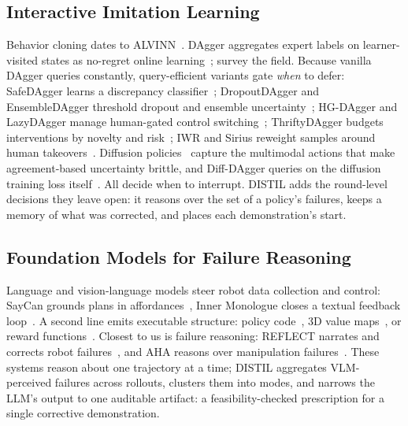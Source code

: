 \documentclass[letterpaper]{article} %
\begin{document}
\subsection{Interactive Imitation Learning}
Behavior cloning dates to ALVINN~\citep{pomerleau1988alvinn}. DAgger
aggregates expert labels on
learner-visited states as no-regret online
learning~\citep{ross2011dagger}; \citet{celemin2022iil} survey the field. Because vanilla DAgger queries
constantly, query-efficient variants gate \emph{when} to defer: SafeDAgger
learns a discrepancy classifier~\citep{zhang2017safedagger}; DropoutDAgger and
EnsembleDAgger threshold dropout and ensemble
uncertainty~\citep{menda2017dropoutdagger,menda2019ensembledagger}; HG-DAgger and LazyDAgger manage human-gated
control switching~\citep{kelly2019hgdagger,hoque2021lazydagger};
ThriftyDAgger budgets interventions by novelty and
risk~\citep{hoque2021thriftydagger}; IWR and Sirius reweight samples
around human takeovers~\citep{mandlekar2020iwr,liu2023sirius}. Diffusion
policies~\citep{chi2023diffusionpolicy,ho2020ddpm} capture
the multimodal actions that make agreement-based uncertainty brittle, and
Diff-DAgger queries on the diffusion training loss
itself~\citep{lee2025diffdagger}. All decide when to interrupt. DISTIL adds
the round-level decisions they leave open: it reasons over the set of a
policy's failures, keeps a memory of what was corrected, and places each
demonstration's start.

\subsection{Foundation Models for Failure Reasoning}
Language and vision-language models steer robot data collection and
control: SayCan grounds plans in affordances~\citep{ahn2022saycan}, Inner
Monologue closes a textual feedback loop~\citep{huang2022innermonologue}.
A second line emits executable structure: policy
code~\citep{liang2023codeaspolicies}, 3D value
maps~\citep{huang2023voxposer}, or reward
functions~\citep{ma2024eureka}. Closest to us is
failure reasoning: REFLECT narrates and corrects robot
failures~\citep{liu2023reflect}, and AHA reasons over manipulation
failures~\citep{duan2025aha}. These systems reason
about one trajectory at a time; DISTIL aggregates VLM-perceived failures
across rollouts, clusters them into modes, and narrows the LLM's output to
one auditable artifact: a feasibility-checked prescription for a single
corrective demonstration.
\end{document}
